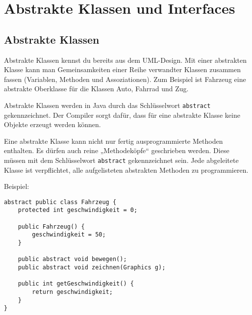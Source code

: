 \chapter{Abstrakte Klassen und Interfaces}
\renewcommand{\chaptertitle}{Abstrakte Klassen und Interfaces}

\lehead[]{\normalfont\sffamily\hspace*{-2.00cm}\textcolor{white}{\colorbox{lightblue}{\makebox[1.60cm][r]{\thechapter}}}\hspace{0.17cm}\textcolor{lightblue}{\chaptertitle}}
\rohead[]{\textcolor{lightblue}{\chaptertitle}\normalfont\sffamily\hspace*{0.17cm}\textcolor{white}{\colorbox{lightblue}{\makebox[1.60cm][l]{\thechapter}}}\hspace{-2.00cm}}
\rehead[]{\textcolor{lightblue}{AvHG, Inf, My}}
\lohead[]{\textcolor{lightblue}{AvHG, Inf, My}}

\lstset{style=myJava}

\section{Abstrakte Klassen}

Abstrakte Klassen kennst du bereits aus dem UML-Design. Mit einer abstrakten
Klasse kann man Gemeinsamkeiten einer Reihe verwandter Klassen zusammen fassen
(Variablen, Methoden und Assoziationen). Zum Beispiel ist Fahrzeug eine
abstrakte Oberklasse für die Klassen Auto, Fahrrad und Zug.

Abstrakte Klassen werden in Java durch das Schlüsselwort \lstinline|abstract|
gekennzeichnet. Der Compiler sorgt dafür, dass für eine abstrakte Klasse keine
Objekte erzeugt werden können.

Eine abstrakte Klasse kann nicht nur fertig ausprogrammierte Methoden
enthalten. Es dürfen auch reine „Methodeköpfe“ geschrieben werden. Diese müssen
mit dem Schlüsselwort \lstinline|abstract| gekennzeichnet sein. Jede
abgeleitete Klasse ist verpflichtet, alle aufgelisteten abstrakten Methoden zu
programmieren.

Beispiel:

\begin{lstlisting}
abstract public class Fahrzeug {
    protected int geschwindigkeit = 0;

    public Fahrzeug() {
        geschwindigkeit = 50;
    }

    public abstract void bewegen();
    public abstract void zeichnen(Graphics g);
    
    public int getGeschwindigkeit() {
        return geschwindigkeit;
    }
}
\end{lstlisting}


